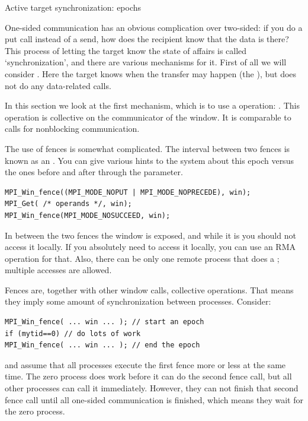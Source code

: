 
 {Active target synchronization: epochs}
\label{sec:fence}

One-sided communication has an obvious complication over two-sided: if
you do a put call instead of a send, how does the recipient know that
the data is there? This process of letting the target know the state
of affairs is called `synchronization', and there are various
mechanisms for it. First of all we will consider . Here the target knows when the transfer
may happen (the ), but does not do
any data-related calls.

In this section we look at the first mechanism,
which is to use a  operation: .
This operation is collective on the communicator of the window.
It is comparable to  calls for nonblocking communication.

The use of fences is somewhat complicated. The interval between two fences
is known as an .
You can give various hints to the system about this epoch versus the ones
before and after through the  parameter.
\begin{lstlisting}
MPI_Win_fence((MPI_MODE_NOPUT | MPI_MODE_NOPRECEDE), win);
MPI_Get( /* operands */, win);
MPI_Win_fence(MPI_MODE_NOSUCCEED, win);
\end{lstlisting}
In between the two fences the window is exposed, and while it is you
should not access it locally. If you absolutely need to access it
locally, you can use an \ac{RMA} operation for that. Also, there can be only one
remote process that does a ; multiple  accesses are allowed.

Fences are, together with other window calls, collective operations. That means they 
imply some amount of synchronization between processes. Consider:
\begin{lstlisting}
MPI_Win_fence( ... win ... ); // start an epoch
if (mytid==0) // do lots of work
MPI_Win_fence( ... win ... ); // end the epoch
\end{lstlisting}
and assume that all processes execute the first fence more or less at the same time.
The zero process does work before it can do the second fence call, but all other
processes can call it immediately. However, they can not finish that second fence call
until all one-sided communication is finished, which means they wait for the zero process.

